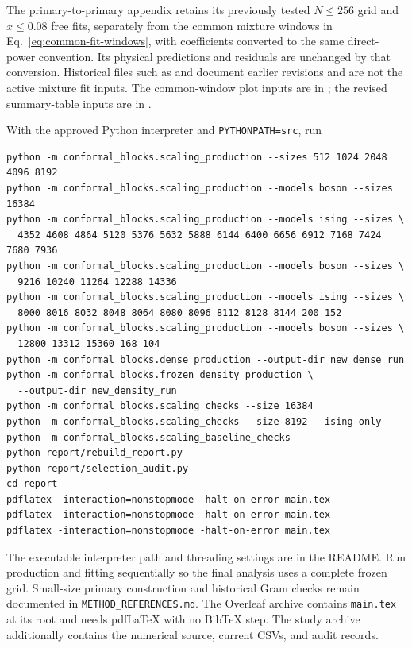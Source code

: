 The primary-to-primary appendix retains its previously tested $N\leq256$
grid and $x\leq0.08$ free fits, separately from the common mixture
windows in Eq.~\eqref{eq:common-fit-windows}, with coefficients converted to the same
direct-power convention.
Its physical predictions and residuals are unchanged by that conversion.
Historical files such as  and
 document earlier revisions and are
not the active mixture fit inputs. The common-window plot inputs are in
; the revised summary-table inputs are in
.

With the approved Python interpreter and \texttt{PYTHONPATH=src}, run
\begin{verbatim}
python -m conformal_blocks.scaling_production --sizes 512 1024 2048 4096 8192
python -m conformal_blocks.scaling_production --models boson --sizes 16384
python -m conformal_blocks.scaling_production --models ising --sizes \
  4352 4608 4864 5120 5376 5632 5888 6144 6400 6656 6912 7168 7424 7680 7936
python -m conformal_blocks.scaling_production --models boson --sizes \
  9216 10240 11264 12288 14336
python -m conformal_blocks.scaling_production --models ising --sizes \
  8000 8016 8032 8048 8064 8080 8096 8112 8128 8144 200 152
python -m conformal_blocks.scaling_production --models boson --sizes \
  12800 13312 15360 168 104
python -m conformal_blocks.dense_production --output-dir new_dense_run
python -m conformal_blocks.frozen_density_production \
  --output-dir new_density_run
python -m conformal_blocks.scaling_checks --size 16384
python -m conformal_blocks.scaling_checks --size 8192 --ising-only
python -m conformal_blocks.scaling_baseline_checks
python report/rebuild_report.py
python report/selection_audit.py
cd report
pdflatex -interaction=nonstopmode -halt-on-error main.tex
pdflatex -interaction=nonstopmode -halt-on-error main.tex
pdflatex -interaction=nonstopmode -halt-on-error main.tex
\end{verbatim}
The executable interpreter path and threading settings are in the README.
Run production and fitting sequentially so the final analysis uses a
complete frozen grid. Small-size primary construction and historical
Gram checks remain documented in \texttt{METHOD\_REFERENCES.md}.
The Overleaf archive contains \texttt{main.tex} at its root and needs
pdfLaTeX with no BibTeX step. The study archive additionally contains
the numerical source, current CSVs, and audit records.
